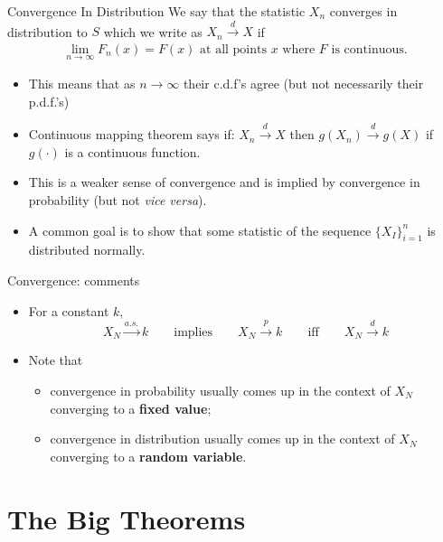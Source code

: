 \documentclass[aspectratio=169,11pt]{beamer}
\begin{document}
\begin{frame}{Convergence In Distribution}
We say that the statistic $X_n$ \alert{converges in distribution} to $S$ which we write as $X_n \overset{d}{\to} X$ if
\begin{align*}
\lim_{n\rightarrow \infty} F_n(x) =F(x) \text{ at all points $x$ where } F \text{ is continuous}.
\end{align*}
\begin{itemize}
	\item This means that as $n \rightarrow \infty$ their c.d.f's agree (but not necessarily their p.d.f.'s)
		\item Continuous mapping theorem says if: $X_n \overset{d}{\to} X$ then $g(X_n) \overset{d}{\to} g(X)$ if $g(\cdot)$ is a continuous function.
		\item This is a \alert{weaker} sense of convergence and is implied by \alert{convergence in probability} (but not \textit{vice versa}).
		\item A common goal is to show that some statistic of the sequence $\{X_I\}_{i=1}^n$ is distributed normally.
\end{itemize}
\end{frame}




\begin{frame}{Convergence: comments}

\begin{itemize}
\item For a constant $k$,
\[
	X_N \overset{a.s.}{\rightarrow} k \qquad \text{implies} \qquad  X_N \overset{p}{\rightarrow} k \qquad \text{iff} \qquad X_N \overset{d}{\rightarrow}  k
\]

\item Note that 
	\begin{itemize}	
		\item convergence in probability usually comes up in the context of $X_N$ converging to a {\bf fixed value}; 
		\item convergence in distribution usually comes up in the context of $X_N$ converging to a {\bf random variable}.	
			
	\end{itemize}
	
\end{itemize}

\end{frame}



\section{The Big Theorems}
\end{document}
